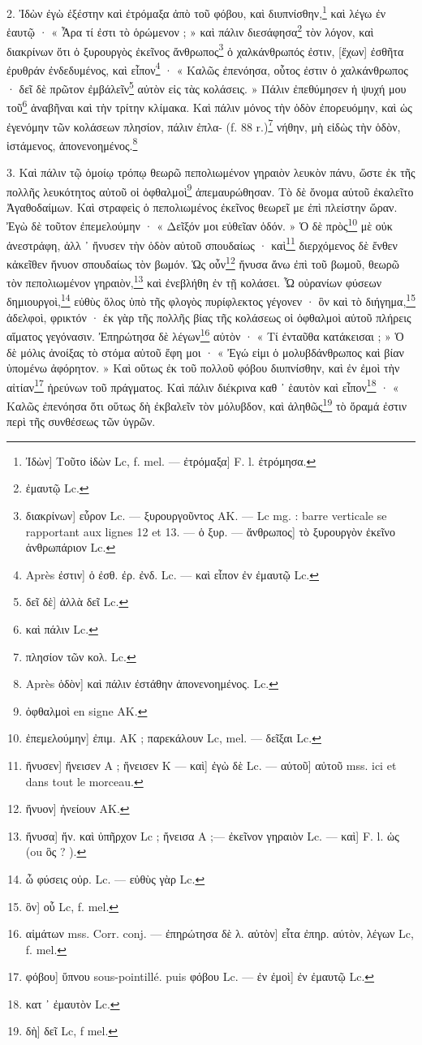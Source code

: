 \documentclass[a4paper, 11pt, oneside, polutonikogreek, french]{article}
\begin{document}
2. Ἰδὼν ἐγὼ ἐξέστην καὶ ἐτρόμαξα ἀπὸ τοῦ φόβου, καὶ διυπνίσθην,\footnote{Ἰδὼν] Τοῦτο ἰδὼν Lc, f. mel. --- ἐτρόμαξα] F. l. ἐτρόμησα.} καὶ λέγω ἐν ἑαυτῷ · « Ἆρα τί ἐστι τὸ ὁρώμενον ; » καὶ πάλιν διεσάφησα\footnote{ἐμαυτῷ Lc.} τὸν λόγον, καὶ διακρίνων ὅτι ὁ ξυρουργὸς ἐκεῖνος ἄνθρωπος\footnote{διακρίνων] εὗρον Lc. --- ξυρουργοῦντος AK. --- Lc mg. : barre verticale se rapportant aux lignes 12 et 13. --- ὁ ξυρ. --- ἄνθρωπος] τὸ ξυρουργὸν ἐκεῖνο ἀνθρωπάριον Lc.} ὁ χαλκάνθρωπός ἐστιν, [ἔχων] ἐσθῆτα ἐρυθράν ἐνδεδυμένος, καὶ εἶπον\footnote{Après ἐστιν] ὁ ἐσθ. ἐρ. ἐνδ. Lc. --- καὶ εἶπον ἐν ἐμαυτῷ Lc.} · « Καλῶς ἐπενόησα, οὗτος ἐστιν ὁ χαλκάνθρωπος · δεῖ δὲ πρῶτον ἐμβάλεῖν\footnote{δεῖ δὲ] ἀλλὰ δεῖ Lc.} αὐτὸν εἰς τὰς κολάσεις. » Πάλιν ἐπεθύμησεν ἡ ψυχή μου τοῦ\footnote{καὶ πάλιν Lc.} ἀναβῆναι καὶ τὴν τρίτην κλίμακα. Καὶ πάλιν μόνος τὴν ὁδὸν ἐπορευόμην, καὶ ὡς ἐγενόμην τῶν κολάσεων πλησίον, πάλιν ἐπλα- (f. 88 r.)\footnote{πλησίον τῶν κολ. Lc.} νήθην, μὴ εἰδὼς τὴν ὁδὸν, ἱστάμενος, ἀπονενοημένος.\footnote{Après ὁδὸν] καὶ πάλιν ἐστάθην ἀπονενοημένος. Lc.}

3. Καὶ πάλιν τῷ ὁμοίῳ τρόπῳ θεωρῶ πεπολιωμένον γηραιὸν λευκὸν πάνυ, ὥστε ἐκ τῆς πολλῆς λευκότητος αὐτοῦ οἱ ὀφθαλμοὶ\footnote{ὀφθαλμοὶ en signe AK.} ἀπεμαυρώθησαν. Τὸ δὲ ὄνομα αὐτοῦ ἐκαλεῖτο Ἀγαθοδαίμων. Καὶ στραφεὶς ὁ πεπολιωμένος ἐκεῖνος θεωρεῖ με ἐπὶ πλείστην ὥραν. Ἐγὼ δὲ τοῦτον ἐπεμελούμην · « Δεῖξόν μοι εὐθεῖαν ὁδόν. » Ὁ δὲ πρὸς\footnote{ἐπεμελούμην] ἐπιμ. AK ; παρεκάλουν Lc, mel. --- δεῖξαι Lc.} μὲ οὐκ ἀνεστράφη, ἀλλ ᾽ ἤνυσεν τὴν ὁδὸν αὐτοῦ σπουδαίως · καὶ\footnote{ἤνυσεν] ἤνεισεν A ; ἥνεισεν K --- καὶ] ἐγὼ δὲ Lc. --- αὑτοῦ] αὐτοῦ mss. ici et dans tout le morceau.} διερχόμενος δὲ ἔνθεν κἀκεῖθεν ἤνυον σπουδαίως τὸν βωμόν. Ὡς οὖν\footnote{ἤνυον] ἠνείουν AK.} ἤνυσα ἄνω ἐπὶ τοῦ βωμοῦ, θεωρῶ τὸν πεπολιωμένον γηραιὸν,\footnote{ἤνυσα] ἤν. καὶ ὐπῆρχον Lc ; ἤνεισα A ;--- ἐκεῖνον γηραιὸν Lc. --- καὶ] F. l. ὡς (ou ὃς ? ).} καὶ ἐνεβλήθη ἐν τῇ κολάσει. Ὦ οὐρανίων φύσεων δημιουργοὶ,\footnote{ὦ φύσεις οὐρ. Lc. --- εὐθὺς γὰρ Lc.} εὐθὺς ὅλος ὑπὸ τῆς φλογὸς πυρίφλεκτος γέγονεν · ὃν καὶ τὸ διήγημα,\footnote{ὃν] οὗ Lc, f. mel.} ἀδελφοὶ, φρικτόν · ἐκ γὰρ τῆς πολλῆς βίας τῆς κολάσεως οἱ ὀφθαλμοὶ αὐτοῦ πλήρεις αἵματος γεγόνασιν. Ἐπηρώτησα δὲ λέγων\footnote{αἱμάτων mss. Corr. conj. --- ἐπηρώτησα δὲ λ. αὐτὸν] εἶτα ἐπηρ. αύτὸν, λέγων Lc, f. mel.} αὐτὸν · « Τί ἐνταῦθα κατάκεισαι ; » Ὁ δὲ μόλις ἀνοίξας τὸ στόμα αὑτοῦ ἔφη μοι · « Ἐγώ εἰμι ὁ μολυβδάνθρωπος καὶ βίαν ὑπομένω ἀφόρητον. » Καὶ οὕτως ἐκ τοῦ πολλοῦ φόβου διυπνίσθην, καὶ ἐν ἐμοὶ τὴν αἰτίαν\footnote{φόβου] ὕπνου sous-pointillé. puis φόβου Lc. --- ἐν ἐμοὶ] ἐν ἐμαυτῷ Lc.} ἠρεύνων τοῦ πράγματος. Καὶ πάλιν διέκρινα καθ ᾽ ἑαυτὸν καὶ εἶπον\footnote{κατ ᾽ ἐμαυτὸν Lc.} · « Καλῶς ἐπενόησα ὅτι οὕτως δὴ ἐκβαλεῖν τὸν μόλυβδον, καὶ ἀληθῶς\footnote{δὴ] δεῖ Lc, f mel.} τὸ ὅραμά ἐστιν περὶ τῆς συνθέσεως τῶν ὑγρῶν.
\end{document}
